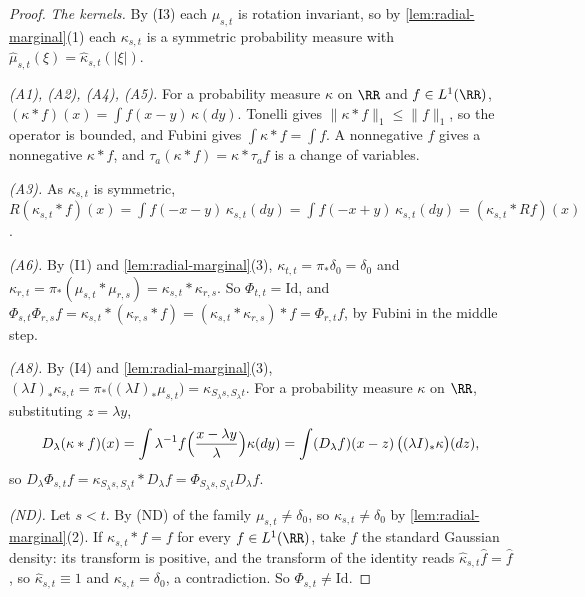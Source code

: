 \begin{proof}
\leanok
\emph{The kernels.} By (I3) each $\mu_{s,t}$ is rotation invariant, so by
\ref{lem:radial-marginal}(1) each $\kappa_{s,t}$ is a symmetric probability measure with
$\widehat\mu_{s,t}(\xi) = \widehat\kappa_{s,t}(|\xi|)$.

\emph{(A1), (A2), (A4), (A5).} For a probability measure $\kappa$ on $\RR$ and $f \in L^1(\RR)$,
$(\kappa * f)(x) = \int f(x-y)\,\kappa(dy)$. Tonelli gives $\|\kappa * f\|_1 \le \|f\|_1$, so the
operator is bounded, and Fubini gives $\int \kappa * f = \int f$. A nonnegative $f$ gives a
nonnegative $\kappa * f$, and $\tau_a(\kappa * f) = \kappa * \tau_af$ is a change of variables.

\emph{(A3).} As $\kappa_{s,t}$ is symmetric, $R(\kappa_{s,t} * f)(x) = \int f(-x-y)\,\kappa_{s,t}(dy)
= \int f(-x+y)\,\kappa_{s,t}(dy) = (\kappa_{s,t} * Rf)(x)$.

\emph{(A6).} By (I1) and \ref{lem:radial-marginal}(3), $\kappa_{t,t} = \pi_*\delta_0 = \delta_0$
and $\kappa_{r,t} = \pi_*(\mu_{s,t} * \mu_{r,s}) = \kappa_{s,t} * \kappa_{r,s}$. So
$\Phi_{t,t} = \mathrm{Id}$, and $\Phi_{s,t}\Phi_{r,s}f = \kappa_{s,t} * (\kappa_{r,s} * f)
= (\kappa_{s,t} * \kappa_{r,s}) * f = \Phi_{r,t}f$, by Fubini in the middle step.

\emph{(A8).} By (I4) and \ref{lem:radial-marginal}(3),
$(\lambda I)_*\kappa_{s,t} = \pi_*\bigl((\lambda I)_*\mu_{s,t}\bigr) = \kappa_{S_\lambda s,S_\lambda t}$.
For a probability measure $\kappa$ on $\RR$, substituting $z = \lambda y$,
\[
  D_\lambda(\kappa * f)(x) = \int \lambda^{-1}f\Bigl(\frac{x - \lambda y}{\lambda}\Bigr)\kappa(dy)
   = \int (D_\lambda f)(x - z)\,\bigl((\lambda I)_*\kappa\bigr)(dz) ,
\]
so $D_\lambda\Phi_{s,t}f = \kappa_{S_\lambda s,S_\lambda t} * D_\lambda f
= \Phi_{S_\lambda s,S_\lambda t}D_\lambda f$.

\emph{(ND).} Let $s < t$. By (ND) of the family $\mu_{s,t} \ne \delta_0$, so
$\kappa_{s,t} \ne \delta_0$ by \ref{lem:radial-marginal}(2). If $\kappa_{s,t} * f = f$ for every
$f \in L^1(\RR)$, take $f$ the standard Gaussian density: its transform is positive, and the
transform of the identity reads $\widehat\kappa_{s,t}\widehat f = \widehat f$, so
$\widehat\kappa_{s,t} \equiv 1$ and $\kappa_{s,t} = \delta_0$, a contradiction. So
$\Phi_{s,t} \ne \mathrm{Id}$.


\end{proof}
